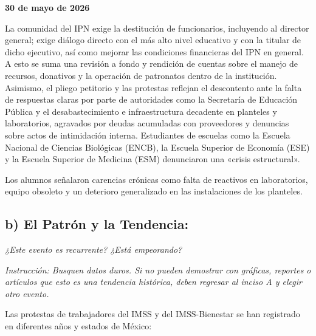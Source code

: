 \documentclass[12pt,letterpaper]{article}
\begin{document}
\textbf{30 de mayo de 2026}

La comunidad del IPN exige la destitución de funcionarios, incluyendo al director general; exige diálogo directo con el más alto nivel educativo y con la titular de dicho ejecutivo, así como mejorar las condiciones financieras del IPN en general. A esto se suma una revisión a fondo y rendición de cuentas sobre el manejo de recursos, donativos y la operación de patronatos dentro de la institución. Asimismo, el pliego petitorio y las protestas reflejan el descontento ante la falta de respuestas claras por parte de autoridades como la Secretaría de Educación Pública y el desabastecimiento e infraestructura decadente en planteles y laboratorios, agravados por deudas acumuladas con proveedores y denuncias sobre actos de intimidación interna. Estudiantes de escuelas como la Escuela Nacional de Ciencias Biológicas (ENCB), la Escuela Superior de Economía (ESE) y la Escuela Superior de Medicina (ESM) denunciaron una «crisis estructural».

Los alumnos señalaron carencias crónicas como falta de reactivos en laboratorios, equipo obsoleto y un deterioro generalizado en las instalaciones de los planteles.

\subsection*{b) El Patrón y la Tendencia:}

\textit{¿Este evento es recurrente? ¿Está empeorando?}

\textit{Instrucción: Busquen datos duros. Si no pueden demostrar con gráficas, reportes o artículos que esto es una tendencia histórica, deben regresar al inciso A y elegir otro evento.}

Las protestas de trabajadores del IMSS y del IMSS-Bienestar se han registrado en diferentes años y estados de México:
\end{document}
